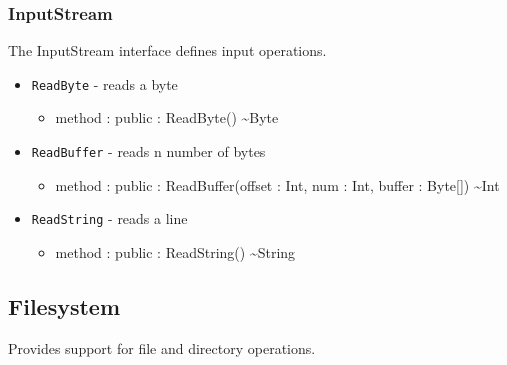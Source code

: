 \documentclass[11pt]{article}
\begin{document}
\subsubsection{InputStream}
The InputStream interface defines input operations.
\begin{itemize}
\item \texttt{ReadByte} - reads a byte
  \begin{itemize}
  \item method : public : ReadByte() \textasciitilde Byte
  \end{itemize}
\item \texttt{ReadBuffer} - reads n number of bytes
  \begin{itemize}
  \item method : public : ReadBuffer(offset : Int, num : Int, buffer :
    Byte[]) \textasciitilde Int
  \end{itemize}
\item \texttt{ReadString} - reads a line
  \begin{itemize}
  \item method : public : ReadString() \textasciitilde String
  \end{itemize}
\end{itemize}  

\subsection{Filesystem}
Provides support for file and directory operations.
\end{document}
